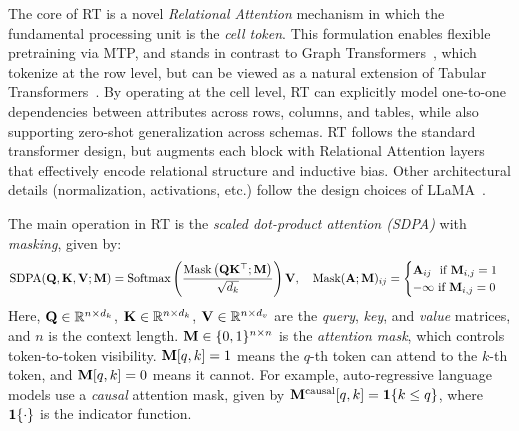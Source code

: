 The core of RT is a novel \emph{Relational Attention} mechanism in which the fundamental processing unit is the \emph{cell token}. This formulation enables flexible pretraining via MTP, and stands in contrast to Graph Transformers~\citep{dwivedi2021generalization, rampavsek2022recipe, ying2021transformers}, which tokenize at the row level, but can be viewed as a natural extension of Tabular Transformers~\citep{tabpfn, tabpfnv2}.
By operating at the cell level, RT can explicitly model one-to-one dependencies between attributes across rows, columns, and tables, while also supporting zero-shot generalization across schemas.  
RT follows the standard transformer design, but augments each block with Relational Attention layers that effectively encode relational structure and inductive bias.  
Other architectural details (normalization, activations, etc.) follow the design choices of LLaMA~\citep{llama}.

The main operation in RT is the \textit{scaled dot-product attention (SDPA)}
with \textit{masking},
given by:
\begin{equation*}
\text{SDPA}({\mathbf{Q}}, {\mathbf{K}}, {\mathbf{V}}; {\mathbf{M}})
= \text{Softmax}\left(\frac{\text{Mask}\left({\mathbf{Q}}{\mathbf{K}}^\top; {\mathbf{M}}\right)}{\sqrt{d_k}}\right) {\mathbf{V}}, \text{~~~}
\text{Mask}({\mathbf{A}}; {\mathbf{M}})_{ij}
= \begin{cases}
    {\mathbf{A}}_{ij} \text{~~if } {\mathbf{M}}_{i,j} = 1\\
    -\infty \text{ if } {\mathbf{M}}_{i,j} = 0
\end{cases}
\end{equation*}
Here,
${\mathbf{Q}} \in \mathbb{R}^{n \times d_k}$, ${\mathbf{K}} \in \mathbb{R}^{n \times d_k}$, ${\mathbf{V}} \in \mathbb{R}^{n \times d_v}$
are the \textit{query}, \textit{key}, and \textit{value} matrices,
and $n$ is the context length.
${\mathbf{M}} \in \{0, 1\}^{n \times n}$ is the \textit{attention mask},
which controls token-to-token visibility.
${\mathbf{M}}[q, k] = 1$ means the $q$-th token can attend to the $k$-th token,
and ${\mathbf{M}}[q, k] = 0$ means it cannot.
For example,
auto-regressive language models use a \textit{causal} attention mask,
given by ${\mathbf{M}}^{\text{causal}}[q, k] = {\mathbf{1}}\{k \le q\}$,
where ${\mathbf{1}}\{\cdot\}$ is the indicator function.

